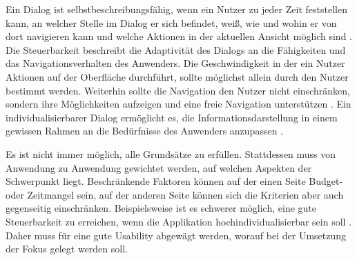 Ein Dialog ist selbstbeschreibungsfähig, wenn ein Nutzer zu jeder Zeit feststellen kann, an welcher Stelle im Dialog er sich befindet, weiß, wie und wohin er von dort navigieren kann und welche Aktionen in der aktuellen Ansicht möglich sind \cite[S. 10]{DIN2006}. Die Steuerbarkeit beschreibt die Adaptivität des Dialogs an die Fähigkeiten und das Navigationsverhalten des Anwenders. Die Geschwindigkeit in der ein Nutzer Aktionen auf der Oberfläche durchführt, sollte möglichst allein durch den Nutzer bestimmt werden. Weiterhin sollte die Navigation den Nutzer nicht einschränken, sondern ihre Möglichkeiten aufzeigen und eine freie Navigation unterstützen \cite[S.13]{DIN2006}. Ein individualisierbarer Dialog ermöglicht es, die Informationsdarstellung in einem gewissen Rahmen an die Bedürfnisse des Anwenders anzupassen \cite[S.15]{DIN2006}. \par
Es ist nicht immer möglich, alle Grundsätze zu erfüllen. Stattdessen muss von Anwendung zu Anwendung gewichtet werden, auf welchen Aspekten der Schwerpunkt liegt. Beschränkende Faktoren können auf der einen Seite Budget- oder Zeitmangel sein, auf der anderen Seite können sich die Kriterien aber auch gegenseitig einschränken. Beispielsweise ist es schwerer möglich, eine gute Steuerbarkeit zu erreichen, wenn die Applikation hochindividualisierbar sein soll \cite{DIN2006}. Daher muss für eine gute Usability abgewägt werden, worauf bei der Umsetzung der Fokus gelegt werden soll.

